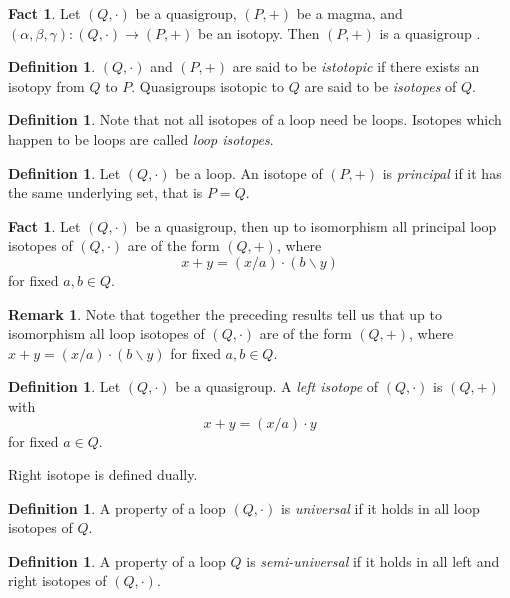 \documentclass[12pt]{report}
\theoremstyle{definition}
\newtheorem{fct}[thm]{Fact}
\newtheorem{dfn}[thm]{Definition}
\newtheorem*{rmk}{Remark}
\newcommand{\ldv}{\backslash}       %
\newcommand{\rdv}{/}                %
\begin{document}
\begin{fct}
  Let $(Q, \cdot)$ be a quasigroup, $(P, +)$ be a magma, and $(\alpha, \beta, \gamma): (Q, \cdot)\to (P, +)$ be an isotopy.
    Then $(P, +)$ is a quasigroup \cite{Bruck}.
\end{fct}

\begin{dfn}
  $(Q, \cdot)$ and $(P, +)$ are said to be \emph{istotopic} if there exists an isotopy from $Q$ to $P$. Quasigroups
    isotopic to $Q$ are said to be \emph{isotopes} of $Q$.
\end{dfn}

\begin{dfn}
  Note that not all isotopes of a loop need be loops. Isotopes which happen to be loops are called \emph{loop isotopes}.
\end{dfn}

\begin{dfn}
  Let $(Q, \cdot)$ be a loop. An isotope of $(P, +)$ is \emph{principal} if it has the same underlying set, that is $P = Q$.
\end{dfn}

\begin{fct}
  Let $(Q, \cdot)$ be a quasigroup, then up to isomorphism all principal loop isotopes of $(Q, \cdot)$ are of the
    form $(Q, +)$, where
  \[x + y = (x\rdv a)\cdot (b\ldv y)\]
  for fixed $a, b\in Q$\cite{Bruck}.
\end{fct}

\begin{rmk}
  Note that together the preceding results tell us that up to isomorphism all loop isotopes of $(Q, \cdot)$ are of the
    form $(Q, +)$, where $x + y = (x\rdv a)\cdot (b\ldv y)$ for fixed $a, b\in Q$.
\end{rmk}

\begin{dfn}
  Let $(Q, \cdot)$ be a quasigroup. A \emph{left isotope} of $(Q, \cdot)$ is $(Q, +)$ with
  \[x + y = (x\rdv a)\cdot y\]
  for fixed $a\in Q$.
\end{dfn}

Right isotope is defined dually.

\begin{dfn}
  A property of a loop $(Q, \cdot)$ is \emph{universal} if it holds in all loop isotopes of $Q$.
\end{dfn}

\begin{dfn}
  A property of a loop $Q$ is \emph{semi-universal} if it holds in all left and right isotopes of $(Q, \cdot)$.
\end{dfn}
\end{document}

